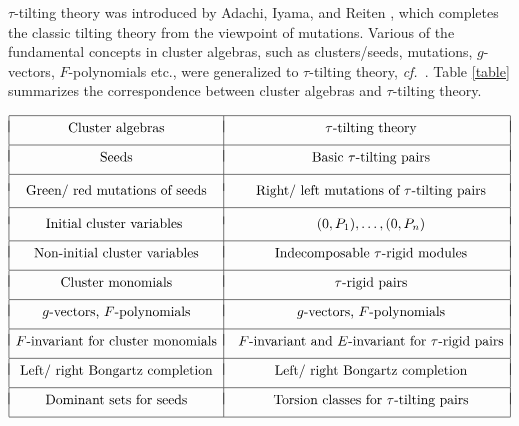 \documentclass[10pt]{amsart}
\theoremstyle{definition}
\theoremstyle{remark}
\numberwithin{equation}{section}
\newcommand{\confer}{\emph{cf.}\ }
\begin{document}
$\tau$-tilting theory was introduced by Adachi, Iyama, and Reiten \cite{air_2014}, which completes the classic tilting theory from the viewpoint of mutations. Various of the fundamental concepts in
cluster algebras, such as clusters/seeds, mutations, $g$-vectors, $F$-polynomials etc., were generalized to $\tau$-tilting theory, \confer \cite{air_2014,fei_2019a,CGY-2023,Cao-2023}.   Table \ref{table} summarizes the correspondence between cluster algebras and $\tau$-tilting theory.
\begin{table}[ht!]
\begin{equation*}
\begin{array}{|c|c|}
\hline
 &
\\[-3mm]
\text{Cluster algebras}& \hspace{2mm} \tau\text{-tilting theory}
\\[2mm]
\hline
 &
\\[-3mm]
\text{Seeds}& \hspace{2mm} \text{Basic } \tau\text{-tilting pairs}
\\[2mm]
\hline
 &
\\[-2mm]
\text{Green/ red mutations of seeds}& \hspace{2mm} \text{Right/ left mutations of } \tau\text{-tilting pairs}
\\[2mm]
\hline
 &
\\[-2mm]
\text{Initial cluster variables } & \hspace{2mm} (0,P_1),\ldots,(0,P_n)
\\[2mm]
\hline
 &
\\[-3mm]
\text{Non-initial  cluster variables}& \hspace{2mm} \text{Indecomposable }\tau\text{-rigid modules}
\\[2mm]
\hline
 &
\\[-3mm]
\text{Cluster monomials}& \hspace{2mm} \tau\text{-rigid pairs}
\\[2mm]
\hline
 &
\\[-3mm]
g\text{-vectors, }F\text{-polynomials}& \hspace{2mm} g\text{-vectors, }F\text{-polynomials}
\\[2mm]
\hline
&
\\[-3mm]
F\text{-invariant for cluster monomials}& \hspace{2mm} F\text{-invariant and $E$-invariant for }\tau\text{-rigid pairs}
\\[2mm]
\hline
 &
\\[-3mm]
\text{Left/ right Bongartz completion}& \hspace{2mm} \text{Left/ right Bongartz completion}
\\[2mm]
\hline
 &
\\[-3mm]
\text{Dominant sets for seeds}& \hspace{2mm} \text{Torsion classes for $\tau$-tilting pairs}
\\[2mm]
\hline
\end{array}
\end{equation*}
\caption{Cluster algebras vs. $\tau$-tilting theory \label{table}}
\end{table}
\end{document}
